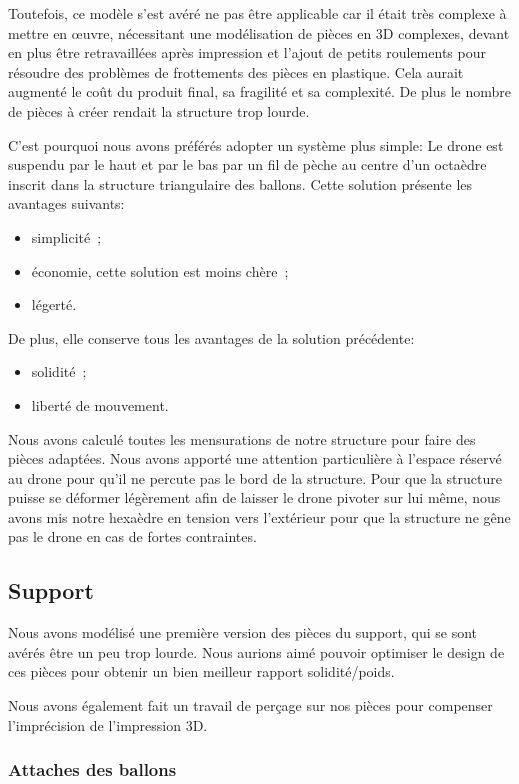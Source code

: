 \documentclass[a4paper,11pt]{article}
\begin{document}
Toutefois, ce modèle s'est avéré ne pas être applicable car il était très complexe à mettre en œuvre, nécessitant une modélisation de pièces en 3D complexes, devant en plus être retravaillées après impression et l'ajout de petits roulements pour résoudre des problèmes de frottements des pièces en plastique. Cela aurait augmenté le coût du produit final, sa fragilité et sa complexité. De plus le nombre de pièces à créer rendait la structure trop lourde.

C'est pourquoi nous avons préférés adopter un système plus simple:
Le drone est suspendu par le haut et par le bas par un fil de pèche au centre d'un octaèdre inscrit dans la structure triangulaire des ballons. Cette solution présente les avantages suivants:
\begin{itemize}
	\item simplicité~;
	\item économie, cette solution est moins chère~;
	\item légerté.
\end{itemize}

De plus, elle conserve tous les avantages de la solution précédente:
\begin{itemize}
	\item solidité~;
	\item liberté de mouvement.
\end{itemize}

Nous avons calculé toutes les mensurations de notre structure pour faire des pièces adaptées. Nous avons apporté une attention particulière à l'espace réservé au drone pour qu'il ne percute pas le bord de la structure. Pour que la structure puisse se déformer légèrement afin de laisser le drone pivoter sur lui même, nous avons mis notre hexaèdre en tension vers l'extérieur pour que la structure ne gêne pas le drone en cas de fortes contraintes.

\subsection{Support}

Nous avons modélisé une première version des pièces du support, qui se sont avérés être un peu trop lourde. Nous aurions aimé pouvoir optimiser le design de ces pièces pour obtenir un bien meilleur rapport solidité/poids.

Nous avons également fait un travail de perçage sur nos pièces pour compenser l'imprécision de l'impression 3D.

\subsubsection{Attaches des ballons}
\end{document}
